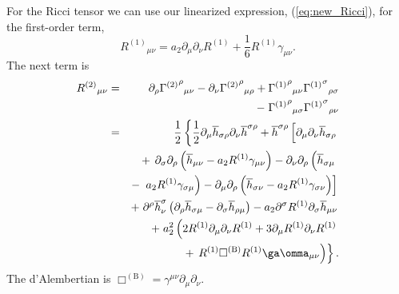 \documentclass[aps,prd,amsfonts,amssymb,amsmath,nofootinbib,reprint,showpacs]{revtex4-1}
\newcommand{\eqnref}[1]{(\ref{eq:#1})}
\newcommand{\recip}[1]{\ensuremath{\frac{1}{#1}}}
\begin{document}
For the Ricci tensor we can use our linearized expression, \eqnref{new_Ricci}, for the first-order term,
\begin{equation}
{R^{(1)}}_{\mu\nu} = a_2\partial_\mu\partial_\nu R^{(1)} + \recip{6} R^{(1)}\gamma_{\mu\nu}.
\end{equation}
The next term is
\begin{eqnarray}
{R^{(2)}}_{\mu\nu} & = & \partial_\rho {{\Gamma^{(2)}}^\rho}_{\mu\nu} - \partial_\nu {{\Gamma^{(2)}}^\rho}_{\mu\rho} + {{\Gamma^{(1)}}^\rho}_{\mu\nu}{{\Gamma^{(1)}}^\sigma}_{\rho\sigma} \nonumber \\* 
 & & - {\;} {{\Gamma^{(1)}}^\rho}_{\mu\sigma}{{\Gamma^{(1)}}^\sigma}_{\rho\nu} \nonumber \\
 & = & \frac{1}{2}\left\{\recip{2}\partial_\mu\overline{h}_{\sigma\rho}\partial_\nu\overline{h}^{\sigma\rho} + \overline{h}^{\sigma\rho}\left[\partial_\mu\partial_\nu\overline{h}_{\sigma\rho} \vphantom{R^{(1)}} \right.\right. \nonumber \\*
 & & + \left.\left. \partial_\sigma\partial_\rho\left(\overline{h}_{\mu\nu} - a_2 R^{(1)}\gamma_{\mu\nu}\right) - \partial_\nu\partial_\rho\left(\overline{h}_{\sigma\mu} \vphantom{R^{(1)}} \right.\right.\right. \nonumber \\*
 & & - \left.\left.\left. a_2 R^{(1)} \gamma_{\sigma\mu}\right) - \partial_\mu\partial_\rho\left(\overline{h}_{\sigma\nu} - a_2 R^{(1)} \gamma_{\sigma\nu}\right)\right] \right. \nonumber \\*
 & & + \left. \partial^\rho\overline{h}^\sigma_\nu\left(\partial_\rho\overline{h}_{\sigma\mu} - \partial_\sigma\overline{h}_{\rho\mu}\right) - a_2 \partial^\sigma R^{(1)}\partial_\sigma\overline{h}_{\mu\nu} \right. \nonumber \\*
 & & + \left. a_2^2 \left(2R^{(1)}\partial_\mu\partial_\nu R^{(1)} + 3\partial_\mu R^{(1)}\partial_\nu R^{(1)} \right.\right. \nonumber \\*
 & & + \left.\left. R^{(1)} \Box^{(\text{B})} R^{(1)} \ga\omma_{\mu\nu}\right)\right\}.
\end{eqnarray}
The d'Alembertian is $\Box^{(\text{B})} = \gamma^{\mu\nu}\partial_\mu\partial_\nu$.
\end{document}
